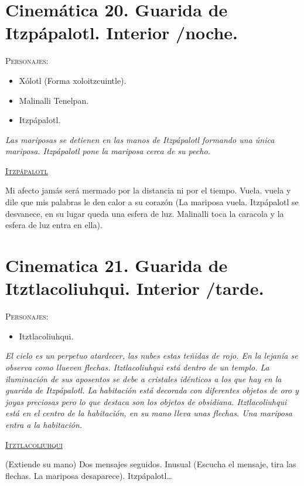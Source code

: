 \documentclass[11pt,letterpaper]{article}
\begin{document}
\section{Cinemática 20. Guarida de Itzpápalotl. Interior /noche.}
\textsc{Personajes}:
\begin{itemize}
\item Xólotl (Forma xoloitzcuintle).
\item Malinalli Tenelpan.
\item Itzpápalotl.
\end{itemize}
\textit{Las mariposas se detienen en las manos de Itzpápalotl formando una única mariposa. Itzpápalotl pone la mariposa cerca de su pecho.}
\begin{center}
\textsc{\underline{Itzpápalotl}}
\\
\par
Mi afecto jamás será mermado por la distancia ni por el tiempo. Vuela. vuela y dile que mis palabras le den calor a su corazón (La mariposa vuela. Itzpápalotl se desvanece, en su lugar queda una esfera de luz. Malinalli toca la caracola y la esfera de luz entra en ella).
\end{center}

\section{Cinematica 21. Guarida de Itztlacoliuhqui. Interior /tarde.}
\textsc{Personajes}:
\begin{itemize}
\item Itztlacoliuhqui. 
\end{itemize}
\textit{El cielo es un perpetuo atardecer, las nubes estas teñidas de rojo. En la lejanía se observa como llueven flechas. Itztlacoliuhqui está dentro de un templo. La iluminación de sus aposentos se debe a cristales idénticos a los que hay en la guarida de Itzpápalotl. La habitación está decorada con diferentes objetos de oro y joyas preciosas pero lo que destaca son los objetos de obsidiana. Itztlacoliuhqui está en el centro de la habitación, en su mano lleva unas flechas. Una mariposa entra a la habitación.}
\begin{center}
\textsc{\underline{Itztlacoliuhqui}}
\\
\par
(Extiende su mano) Dos mensajes seguidos. Inusual (Escucha el mensaje, tira las flechas. La mariposa desaparece).  Itzpápalotl…
\end{center}
\end{document}
